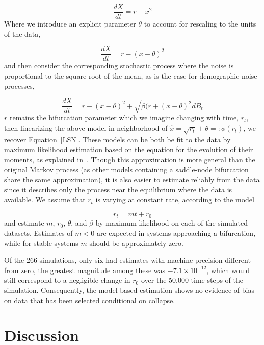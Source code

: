 \documentclass[authoryear,review,12pt]{elsarticle}
\begin{document}
\begin{equation}
  \frac{dX}{dt} = r - x^2
\end{equation}
Where we introduce an explicit parameter $\theta$ to account for rescaling
to the units of the data,

\begin{equation}
   \frac{dX}{dt} = r - (x-\theta)^2
\end{equation}
and then consider the corresponding stochastic process where the noise is
proportional to the square root of the mean, as is the case for demographic
noise processes,

\begin{equation}
  \frac{dX}{dt} = r - (x-\theta)^2 + \sqrt{ \beta (r + (x-\theta)^2 } dB_t
\end{equation}
$r$ remains the bifurcation parameter which we imagine changing with time,
$r_t$, then linearizing the above model in neighborhood of
\(\hat x = \sqrt{r_t} +\theta =: \phi(r_t)\), we recover Equation~\eqref{LSN}.
These models can be both be fit to the data by maximum likelihood estimation
based on the equation for the evolution of their moments, as explained
in~\citet{Boettiger2012b}.  Though this approximation is more general than 
the original Markov process (as other models containing a saddle-node bifurcation
share the same approximation), it is also easier to estimate reliably from 
the data since it describes only the process near the equilibrium where the
data is available.  We assume that $r_t$ is varying at constant rate, 
according to the model

\begin{equation}
 r_t = m t + r_0 
\end{equation}
and estimate $m$, $r_0$, $\theta$, and $\beta$ by maximum likelihood on each
of the simulated datasets.  Estimates of $m < 0 $ are expected in systems 
approaching a bifurcation, while for stable systems $m$ should be approximately zero.


Of the 266 simulations, only six had estimates with machine precision different
from zero, the greatest magnitude among these was $-7.1 \times 10^{-12}$,
which would still correspond to a negligible change in $r_0$ over the 50,000 time steps
of the simulation.  Consequently, the model-based estimation shows no 
evidence of bias on data that has been selected conditional on collapse.   



 \section{Discussion}
\end{document}
